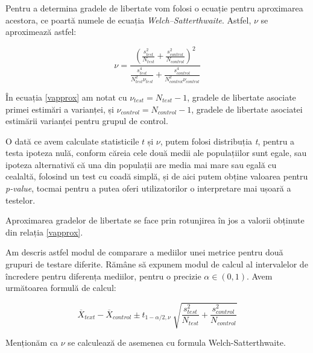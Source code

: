 \vspace{0.8cm}

Pentru a determina gradele de libertate vom folosi o ecuație pentru aproximarea acestora, ce poartă numele de ecuația \textit{Welch–Satterthwaite}\cite{Welch1947}. Astfel, $\nu$ se aproximează astfel:

\begin{equation}
\label{vapprox}
\nu = \frac{({\frac{s_{test}^2}{N_{test}} }+ {\frac{s_{control}^2}{N_{control}}}) ^ 2}{
	\frac{s_{test}^4}{N_{test}^2 \nu_{test}} + 
	\frac{s_{control}^4}{N_{control}^2 \nu_{control}}
}
\end{equation}

\vspace{0.8cm}

În ecuația \ref{vapprox} am notat cu $\nu_{test} = N_{test} - 1$, gradele de libertate asociate primei estimări a varianței,  și $\nu_{control} = N_{control} - 1$, gradele de libertate asociatei estimării varianței pentru grupul de control.

O dată ce avem calculate statisticile $t$ și $\nu$, putem folosi distribuția \textit{t}, pentru a testa ipoteza nulă, conform căreia cele două medii ale populațiilor sunt egale, sau ipoteza alternativă că una din populații are media mai mare sau egală cu cealaltă, folosind un test cu coadă simplă, și de aici putem obține valoarea pentru \textit{p-value}, tocmai pentru a putea oferi utilizatorilor o interpretare mai ușoară a testelor.

\begin{remark}
	Aproximarea gradelor de libertate se face prin rotunjirea în jos a valorii obținute din relația \ref{vapprox}.
\end{remark}

Am descris astfel modul de comparare a mediilor unei metrice pentru două grupuri de testare diferite. Rămâne să expunem modul de calcul al intervalelor de încredere pentru diferența mediilor, pentru o precizie $\alpha \in (0, 1)$. Avem următoarea formulă de calcul: \cite{miao}

\begin{equation}
\label{interval}
\overline{X}_{text} - \overline{X}_{control} \pm t_{1 - \alpha/2, \nu} \
\sqrt{ {\frac{s_{test}^2}{N_{test}} }+ {\frac{s_{control}^2}{N_{control}}}}
\end{equation}

\vspace{0.8cm}

Menționăm ca $\nu$ se calculează de asemenea cu formula Welch-Satterthwaite.

